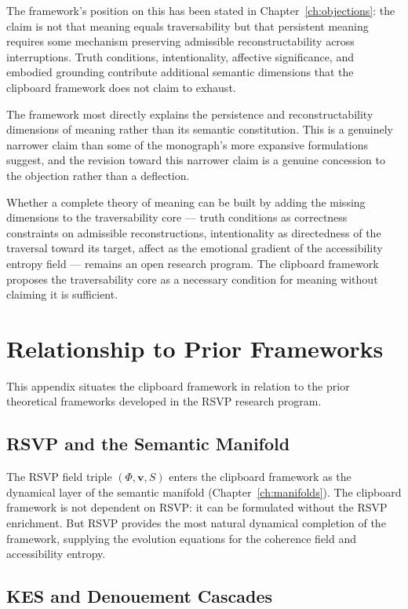 \documentclass[12pt,oneside]{book}
\theoremstyle{plain}
\theoremstyle{definition}
\theoremstyle{plain}
\begin{document}
The framework's position on this has been stated in Chapter~\ref{ch:objections}: the claim is not that meaning equals traversability but that persistent meaning requires some mechanism preserving admissible reconstructability across interruptions. Truth conditions, intentionality, affective significance, and embodied grounding contribute additional semantic dimensions that the clipboard framework does not claim to exhaust.

The framework most directly explains the persistence and reconstructability dimensions of meaning rather than its semantic constitution. This is a genuinely narrower claim than some of the monograph's more expansive formulations suggest, and the revision toward this narrower claim is a genuine concession to the objection rather than a deflection.

Whether a complete theory of meaning can be built by adding the missing dimensions to the traversability core — truth conditions as correctness constraints on admissible reconstructions, intentionality as directedness of the traversal toward its target, affect as the emotional gradient of the accessibility entropy field — remains an open research program. The clipboard framework proposes the traversability core as a necessary condition for meaning without claiming it is sufficient.

\chapter{Relationship to Prior Frameworks}
\label{app:prior_frameworks}

This appendix situates the clipboard framework in relation to the prior theoretical frameworks developed in the RSVP research program.

\section{RSVP and the Semantic Manifold}

The RSVP field triple $(\Phi, \mathbf{v}, S)$ enters the clipboard framework as the dynamical layer of the semantic manifold (Chapter~\ref{ch:manifolds}). The clipboard framework is not dependent on RSVP: it can be formulated without the RSVP enrichment. But RSVP provides the most natural dynamical completion of the framework, supplying the evolution equations for the coherence field and accessibility entropy.

\section{KES and Denouement Cascades}
\end{document}

